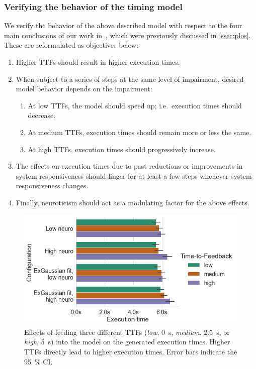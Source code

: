 \subsubsection{Verifying the behavior of the timing model}\label{ssec:model:verification}

We verify the behavior of the above described model with respect to the four main conclusions of our work in~\cite{olguinmunoz:impact2021}, which were previously discussed in \cref{ssec:plos}.
These are reformulated as objectives below:

\begin{enumerate}
    \item\label{it:ttftoexectime} Higher \acp{TTF} should result in higher execution times.
    \item\label{it:duration} When subject to a series of steps at the same level of impairment, desired model behavior depends on the impairment:
    \begin{enumerate}
        \item At low \acp{TTF}, the model should speed up; i.e.\ execution times should decrease.
        \item At medium \acp{TTF}, execution times should remain more or less the same.
        \item At high \acp{TTF}, execution times should progressively increase.
    \end{enumerate}
    \item The effects on execution times due to past reductions or improvements in system responsiveness should linger for at least a few steps whenever system responsiveness changes.
    \item\label{it:neuro} Finally, neuroticism should act as a modulating factor for the above effects.
\end{enumerate}

\begin{figure}
    \centering
    \includegraphics[width=\columnwidth]{figs/new_model/ttf_to_exectime.png}
    \caption{%
        Effects of feeding three different \acp{TTF} (\emph{low}, \SI{0}{\second}, \emph{medium}, \SI{2.5}{\second}, or \emph{high}, \SI{5}{\second}) into the model on the generated execution times.
        Higher \acp{TTF} directly lead to higher execution times.
        Error bars indicate the \SI{95}{\percent} \ac{CI}.
    }\label{fig:ttf_to_exectime}
\end{figure}

